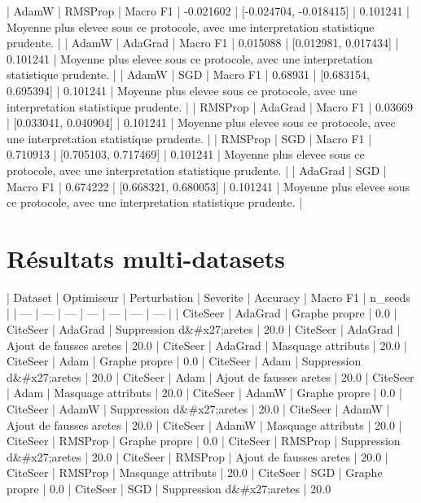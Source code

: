 \documentclass[11pt,a4paper]{article}
\begin{document}
| AdamW | RMSProp | Macro F1 | -0.021602 | [-0.024704, -0.018415] | 0.101241 | Moyenne plus elevee sous ce protocole, avec une interpretation statistique prudente. |
| AdamW | AdaGrad | Macro F1 | 0.015088 | [0.012981, 0.017434] | 0.101241 | Moyenne plus elevee sous ce protocole, avec une interpretation statistique prudente. |
| AdamW | SGD | Macro F1 | 0.68931 | [0.683154, 0.695394] | 0.101241 | Moyenne plus elevee sous ce protocole, avec une interpretation statistique prudente. |
| RMSProp | AdaGrad | Macro F1 | 0.03669 | [0.033041, 0.040904] | 0.101241 | Moyenne plus elevee sous ce protocole, avec une interpretation statistique prudente. |
| RMSProp | SGD | Macro F1 | 0.710913 | [0.705103, 0.717469] | 0.101241 | Moyenne plus elevee sous ce protocole, avec une interpretation statistique prudente. |
| AdaGrad | SGD | Macro F1 | 0.674222 | [0.668321, 0.680053] | 0.101241 | Moyenne plus elevee sous ce protocole, avec une interpretation statistique prudente. |
\par
\section{Résultats multi-datasets}
\par
| Dataset | Optimiseur | Perturbation | Severite | Accuracy | Macro F1 | n_seeds |
| --- | --- | --- | --- | --- | --- | --- |
| CiteSeer | AdaGrad | Graphe propre | 0.0%
| CiteSeer | AdaGrad | Suppression d&#x27;aretes | 20.0%
| CiteSeer | AdaGrad | Ajout de fausses aretes | 20.0%
| CiteSeer | AdaGrad | Masquage attributs | 20.0%
| CiteSeer | Adam | Graphe propre | 0.0%
| CiteSeer | Adam | Suppression d&#x27;aretes | 20.0%
| CiteSeer | Adam | Ajout de fausses aretes | 20.0%
| CiteSeer | Adam | Masquage attributs | 20.0%
| CiteSeer | AdamW | Graphe propre | 0.0%
| CiteSeer | AdamW | Suppression d&#x27;aretes | 20.0%
| CiteSeer | AdamW | Ajout de fausses aretes | 20.0%
| CiteSeer | AdamW | Masquage attributs | 20.0%
| CiteSeer | RMSProp | Graphe propre | 0.0%
| CiteSeer | RMSProp | Suppression d&#x27;aretes | 20.0%
| CiteSeer | RMSProp | Ajout de fausses aretes | 20.0%
| CiteSeer | RMSProp | Masquage attributs | 20.0%
| CiteSeer | SGD | Graphe propre | 0.0%
| CiteSeer | SGD | Suppression d&#x27;aretes | 20.0%
\par
\end{document}
